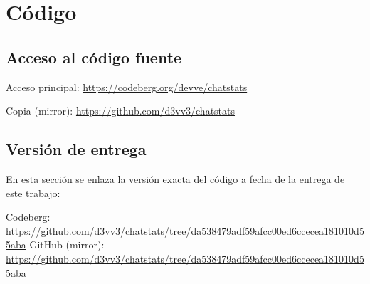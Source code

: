 \chapter{Código} \label{chap:code}

\section{Acceso al código fuente}

Acceso principal: \url{https://codeberg.org/devve/chatstats}

Copia (mirror): \url{https://github.com/d3vv3/chatstats}


\section{Versión de entrega}

En esta sección se enlaza la versión exacta del código a fecha de la entrega de este trabajo:

Codeberg: \url{https://github.com/d3vv3/chatstats/tree/da538479adf59afcc00ed6ccecea181010d55aba}
GitHub (mirror): \url{https://github.com/d3vv3/chatstats/tree/da538479adf59afcc00ed6ccecea181010d55aba}

